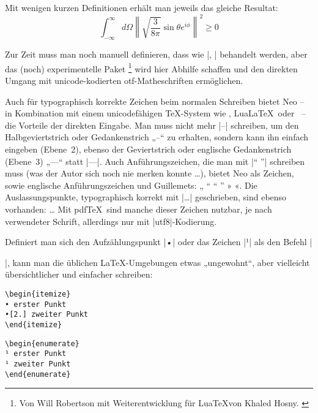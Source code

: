\documentclass[ngerman]{dtk}
\newcommand\LuaTeX{Lua\TeX}
\newcommand\LuaLaTeX{Lua\LaTeX}
\begin{document}
{{Mit wenigen kurzen Definitionen erhält man jeweils das gleiche Resultat:
\[\textstyle \int_{-\infty}^\infty d\Omega \left\|\sqrt{\frac{3}{8\pi}} \sin\theta e^{i\phi}\right\|^2 \geq 0\]

Zur Zeit muss man noch manuell definieren, dass  wie |\int, \geq| behandelt werden, aber das (noch) experimentelle Paket \footnote{Von Will Robertson mit Weiterentwicklung für \LuaTeX von Khaled Hosny. \cite{unicode-math}} wird hier Abhilfe schaffen und den direkten Umgang mit unicode-kodierten otf-Matheschriften ermöglichen.

Auch für typographisch korrekte Zeichen beim normalen Schreiben bietet Neo – in Kombination mit einem unicodefähigen \TeX-System wie \XeLaTeX, \LuaLaTeX\ oder \ConTeXt\ – die Vorteile der direkten Eingabe. Man muss nicht mehr |--| schreiben, um den Halbgeviertstrich oder Gedankenstrich „–“ zu erhalten, sondern kann ihn einfach eingeben (Ebene~2), ebenso der Geviertstrich oder englische Gedankenstrich (Ebene~3) „—“ statt |---|. Auch Anführungszeichen, die man mit  |"` "'| schreiben muss (was der Autor sich noch nie merken konnte \dots{}), bietet Neo als Zeichen, sowie englische Anführungszeichen und Guillemets: „ “ “ ”  » «. Die Auslassungspunkte, typographisch korrekt mit |\dots| geschrieben, sind ebenso vorhanden: … Mit pdf\TeX\ sind manche dieser Zeichen nutzbar, je nach verwendeter Schrift, allerdings nur mit |utf8|-Kodierung.

Definiert man sich den Aufzählungspunkt |•| oder das Zeichen |¹| als den Befehl |\item|, kann man die üblichen \LaTeX-Umgebungen etwas „ungewohnt“, aber vielleicht übersichtlicher und einfacher schreiben:

\begin{minipage}{.4\textwidth}
\begin{verbatim}
\begin{itemize}
• erster Punkt
•[2.] zweiter Punkt
\end{itemize} 
\end{verbatim}
\end{minipage}
\hfill
\begin{minipage}{.4\textwidth}
\begin{verbatim}
\begin{enumerate}
¹ erster Punkt
¹ zweiter Punkt
\end{enumerate} 
\end{verbatim}
\end{minipage}

}}
\end{document}
